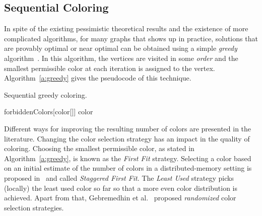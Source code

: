 \documentclass{article}
\begin{document}
\subsection{Sequential Coloring}

In spite of the existing pessimistic theoretical results and the existence of more
complicated algorithms, for many graphs that shows up in practice,
solutions that are provably optimal or near optimal can be obtained
using a simple {\em greedy} algorithm~\cite{CM83}. In this algorithm,
the vertices are visited in some {\em order} and the smallest
permissible color at each iteration is assigned to the vertex. 
Algorithm~\ref{a:greedy} gives the pseudocode of this technique.

\begin{algorithm}
\DontPrintSemicolon
{}

\caption{Sequential greedy coloring.}
\label{a:greedy}
\KwData{}

   {
       {
      \textsf{forbiddenColors}[\textsf{color}[]]   \;
}
      \textsf{color} \label{l:assign} \;
}
\end{algorithm}

Different ways for improving the resulting number of colors
are presented in the literature. Changing the color selection strategy
has an impact in the quality of coloring. Choosing the smallest permissible color,
as stated in Algorithm~\ref{a:greedy},
is known as the {\em First Fit} strategy. Selecting a color based
on an initial estimate of the number of colors in a distributed-memory setting
is proposed in~\cite{BGMBC-jpdc} and called {\em Staggered First Fit}.
The {\em Least Used} strategy picks (locally) the least used color so far so that
a more even color distribution is achieved. Apart from that, 
Gebremedhin et al.~\cite{Gebremedhin02paralleldistance-k}
proposed {\em randomized} color selection strategies.
\end{document}
